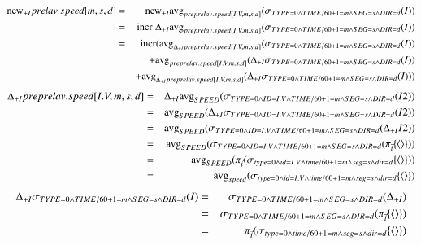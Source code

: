 \begin{eqnarray*}
\algnew_{+I} prelav.speed[m,s,d] &=& \algnew_{+I} \algavg_{preprelav.speed[I.V,m,s,d]} (\sigma_ {TYPE=0 \wedge TIME/60 +1 = m \wedge SEG = s \wedge DIR = d } (I))\\
&=& 
\algincr \; \Delta_{+I} \algavg_{preprelav.speed[I.V,m,s,d]} (\sigma_ {TYPE=0 \wedge TIME/60 +1 = m \wedge SEG = s \wedge DIR = d } (I))\\
&=& 
\algincr (\algavg_{\Delta_{+I} preprelav.speed[I.V,m,s,d]} (\sigma_ {TYPE=0 \wedge TIME/60 +1 = m \wedge SEG = s \wedge DIR = d } (I)) \\
&&+ \algavg_{preprelav.speed[I.V, m,s,d]} (\Delta_{+I} \sigma_ {TYPE=0 \wedge TIME/60 +1 = m \wedge SEG = s \wedge DIR = d } (I)) \\
&&+ \algavg_{\Delta_{+I} preprelav.speed[I.V,m,s,d]} (\Delta_{+I} \sigma_ {TYPE=0 \wedge TIME/60 +1 = m \wedge SEG = s \wedge DIR = d } (I)))\\
%
\end{eqnarray*}
\begin{eqnarray*}
\Delta_{+I} preprelav.speed[I.V,m,s,d] 
&=& \Delta_{+I} \mathrm{avg}_{SPEED} (\sigma_ {TYPE=0 \wedge ID = I.V \wedge TIME/60 +1 = m \wedge SEG = s \wedge DIR = d } (I2))\\
&=& \mathrm{avg}_{SPEED} (\Delta_{+I} \sigma_ {TYPE=0 \wedge ID = I.V \wedge TIME/60 +1 = m \wedge SEG = s \wedge DIR = d } (I2))\\
&=& \mathrm{avg}_{SPEED} (\sigma_ {TYPE=0 \wedge ID = I.V \wedge TIME/60 +1 = m \wedge SEG = s \wedge DIR = d } (\Delta_{+I} I2))\\
&=& \mathrm{avg}_{SPEED} (\sigma_ {TYPE=0 \wedge ID = I.V \wedge TIME/60 +1 = m \wedge SEG = s \wedge DIR = d } (\pi_{\vec{i}} \{{\langle\rangle}\}))\\
&=& \mathrm{avg}_{SPEED} (\pi_{\vec{i}} (\sigma_ {type=0 \wedge id = I.V \wedge time/60 +1 = m \wedge seg = s \wedge dir = d } \{{\langle\rangle}\} ))\\
&=& \mathrm{avg}_{speed} (\sigma_ {type=0 \wedge id = I.V \wedge time/60 +1 = m \wedge seg = s \wedge dir = d } \{{\langle\rangle}\})
\end{eqnarray*}
%
\begin{eqnarray*}
\Delta_{+I} \sigma_ {TYPE=0 \wedge TIME/60 +1 = m \wedge SEG = s \wedge DIR = d } (I)
&=& \sigma_ {TYPE=0 \wedge TIME/60 +1 = m \wedge SEG = s \wedge DIR = d } (\Delta_{+I})\\
&=& \sigma_ {TYPE=0 \wedge TIME/60 +1 = m \wedge SEG = s \wedge DIR = d } (\pi_{\vec{i}} \{{\langle\rangle}\})\\
&=& \pi_{\vec{i}} (\sigma_ {type=0 \wedge time/60 +1 = m \wedge seg = s \wedge dir = d } \{{\langle\rangle}\})
\end{eqnarray*}
